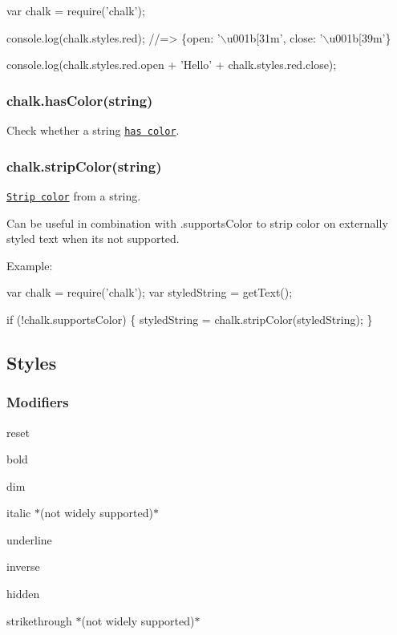 \begin{DoxyCode}
var chalk = require('chalk');

console.log(chalk.styles.red);
//=> \{open: '\(\backslash\)u001b[31m', close: '\(\backslash\)u001b[39m'\}

console.log(chalk.styles.red.open + 'Hello' + chalk.styles.red.close);
\end{DoxyCode}


\subsubsection*{chalk.\+has\+Color(string)}

Check whether a string \href{https://github.com/chalk/has-ansi}{\tt has color}.

\subsubsection*{chalk.\+strip\+Color(string)}

\href{https://github.com/chalk/strip-ansi}{\tt Strip color} from a string.

Can be useful in combination with {\ttfamily .supports\+Color} to strip color on externally styled text when it\textquotesingle{}s not supported.

Example\+:


\begin{DoxyCode}
var chalk = require('chalk');
var styledString = getText();

if (!chalk.supportsColor) \{
  styledString = chalk.stripColor(styledString);
\}
\end{DoxyCode}


\subsection*{Styles}

\subsubsection*{Modifiers}


\begin{DoxyItemize}
\item {\ttfamily reset}
\item {\ttfamily bold}
\item {\ttfamily dim}
\item {\ttfamily italic} $\ast$(not widely supported)$\ast$
\item {\ttfamily underline}
\item {\ttfamily inverse}
\item {\ttfamily hidden}
\item {\ttfamily strikethrough} $\ast$(not widely supported)$\ast$
\end{DoxyItemize}

